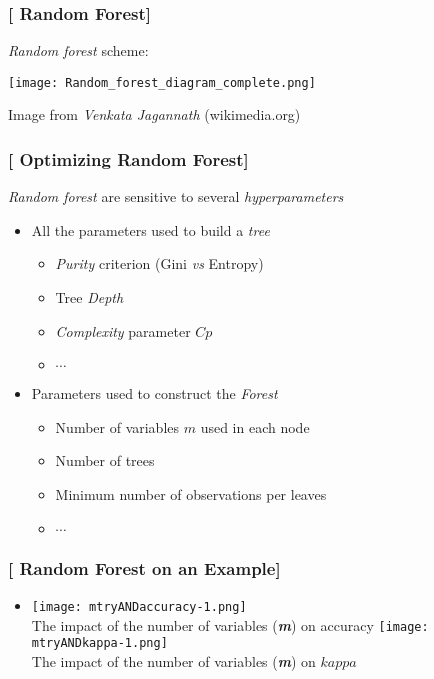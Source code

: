 \documentclass[xcolor=x11names,compress]{beamer}
\renewcommand{\(}{\begin{columns}}
\renewcommand{\)}{\end{columns}}
\newcommand{\<}[1]{\begin{column}{#1}}
\renewcommand{\>}{\end{column}}
\begin{document}
\begin{frame}
\frametitle{\textcolor{brique}{[ Random Forest]}}
\textit{Random forest} scheme:
\begin{center}
\texttt{[image: Random\_forest\_diagram\_complete.png]}\\
\end{center}
 \textcolor{gris}{\small Image from  \textit{Venkata Jagannath} (wikimedia.org) }
\end{frame}


\begin{frame}
\frametitle{\textcolor{brique}{[ Optimizing Random Forest]}}
\textit{Random forest} are sensitive to several \textit{hyperparameters}
\pause
\begin{itemize}[<+->]
    \item All the parameters used to build a \textit{tree}
    \begin{itemize}[<+->]
        \item \textit{Purity} criterion (Gini \textit{vs} Entropy)
        \item Tree \textit{Depth}
        \item \textit{Complexity} parameter $Cp$
        \item $\cdots$
    \end{itemize}
    \item Parameters used to construct the \textit{Forest}
    \begin{itemize}[<+->]
        \item Number of variables $m$  used in each node
        \item Number of trees
        \item Minimum number of observations per leaves
        \item $\cdots$
    \end{itemize}
\end{itemize}
\end{frame}


\begin{frame}
\frametitle{\textcolor{brique}{[ Random Forest on an Example]}}
\pause
\begin{itemize}
\item[]
    {\texttt{[image: mtryANDaccuracy-1.png]}\\  }
    {The impact of the number of variables (\textbf{\textit{m}}) on accuracy}
    {\texttt{[image: mtryANDkappa-1.png]}\\ }
    {The impact of the number of variables (\textbf{\textit{m}}) on $kappa$ }
\end{itemize}
\end{frame}
\end{document}
